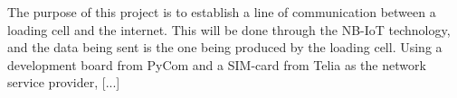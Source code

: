 The purpose of this project is to establish a line of communication between a loading cell and the internet. This will be done through the NB-IoT technology, and the data being sent is the one being produced by the loading cell. Using a development board from PyCom and a SIM-card from Telia as the network service provider, [...]